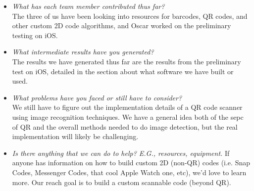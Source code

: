 \begin{itemize}
  \item \emph{What has each team member contributed thus far?} \\
  The three of us have been looking into resources for barcodes, QR codes, and other custom 2D code algorithms, and Oscar worked on the preliminary testing on iOS.
  \item \emph{What intermediate results have you generated?} \\
  The results we have generated thus far are the results from the preliminary test on iOS, detailed in the section about what software we have built or used.
  \item \emph{What problems have you faced or still have to consider?} \\
  We still have to figure out the implementation details of a QR code scanner using image recognition techniques. We have a general idea both of the sepc of QR and the overall methods needed to do image detection, but the real implementation will likely be challenging.
  \item \emph{Is there anything that we can do to help? E.G., resources, equipment.}
  If anyone has information on how to build custom 2D (non-QR) codes (i.e. Snap Codes, Messenger Codes, that cool Apple Watch one, etc), we’d love to learn more. Our reach goal is to build a custom scannable code (beyond QR).
\end{itemize}


